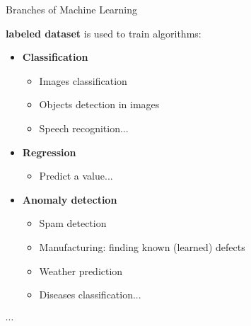 \documentclass[10pt,serif,mathserif,compress,hyperref={colorlinks}]{beamer}
\begin{document}
\begin{frame}{Branches of Machine Learning}


  \begin{tcolorbox}[title={\bf Supervised learning}]
    {\bf labeled dataset} is used to train algorithms:
    \begin{itemize}
    \item \textbf{Classification}
      \begin{itemize}
      \item Images classification
      \item Objects detection in images
      \item Speech recognition...
      \end{itemize}
    \item \textbf{Regression}
      \begin{itemize}
      \item Predict a value...
      \end{itemize}
    \item \textbf{Anomaly detection}
      \begin{itemize}
      \item Spam detection
      \item Manufacturing: finding known (learned) defects
      \item Weather prediction
      \item Diseases classification...
      \end{itemize}        
    \end{itemize}
    \vspace*{-1mm}$\cdots$
  \end{tcolorbox}
  
\end{frame}
\end{document}
